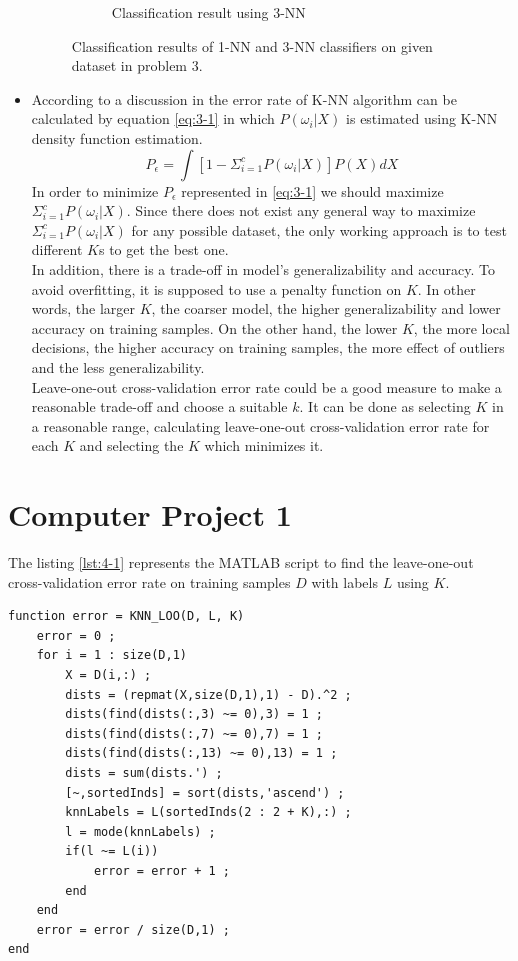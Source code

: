 \documentclass[12pt]{article}
\begin{document}
\begin{itemize}
\begin{figure}[h]
\begin{subfigure}{0.45\textwidth}
\caption{Classification result using 3-NN}
\label{fig:3-3}
\end{subfigure}
\caption{Classification results of 1-NN and 3-NN classifiers on given dataset in problem 3.}
\end{figure}
\item According to a discussion in \cite{duda2012pattern} the error rate of K-NN algorithm can be calculated by equation \eqref{eq:3-1} in which $P(\omega_i|X)$ is estimated using K-NN density function estimation.
\begin{equation}
P_\epsilon = \int [1 - \Sigma_{i=1}^c P(\omega_i|X)] P(X) dX
\label{eq:3-1}
\end{equation}
In order to minimize $P_\epsilon$ represented in \eqref{eq:3-1} we should maximize $\Sigma_{i=1}^c P(\omega_i|X)$. Since there does not exist any general way to maximize $\Sigma_{i=1}^c P(\omega_i|X)$ for any possible dataset, the only working approach is to test different $K$s to get the best one. \\
In addition, there is a trade-off in model's generalizability and accuracy. To avoid overfitting, it is supposed to use a penalty function on $K$. In other words, the larger $K$, the coarser model, the higher generalizability and lower accuracy on training samples. On the other hand, the lower $K$, the more local decisions, the higher accuracy on training samples, the more effect of outliers and the less generalizability.\\
Leave-one-out cross-validation error rate could be a good measure to make a reasonable trade-off and choose a suitable $k$. It can be done as selecting $K$ in a reasonable range, calculating leave-one-out cross-validation error rate for each $K$ and selecting the $K$ which minimizes it. 
\end{itemize}
\section{Computer Project 1}
The listing \ref{lst:4-1} represents the MATLAB script to find the leave-one-out cross-validation error rate on training samples $D$ with labels $L$ using $K$.
\begin{lstlisting}[caption=K-NN code to compute leave-one-out cross-validation error rate on training set D with labels L using K, label=lst:4-1]
function error = KNN_LOO(D, L, K)
    error = 0 ;
    for i = 1 : size(D,1)
        X = D(i,:) ;
        dists = (repmat(X,size(D,1),1) - D).^2 ;
        dists(find(dists(:,3) ~= 0),3) = 1 ;
        dists(find(dists(:,7) ~= 0),7) = 1 ;
        dists(find(dists(:,13) ~= 0),13) = 1 ;
        dists = sum(dists.') ; 
        [~,sortedInds] = sort(dists,'ascend') ;
        knnLabels = L(sortedInds(2 : 2 + K),:) ;
        l = mode(knnLabels) ;
        if(l ~= L(i))
            error = error + 1 ;
        end
    end
    error = error / size(D,1) ;
end
\end{lstlisting}
\end{document}
